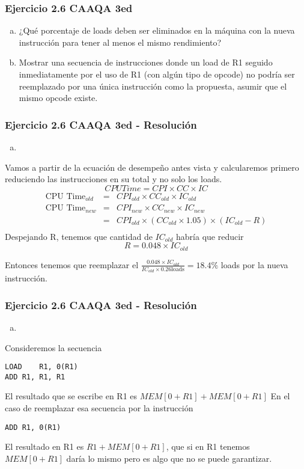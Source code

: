 \documentclass{beamer}
\begin{document}
\begin{frame}
 \frametitle{Ejercicio 2.6 CAAQA 3ed}
\begin{enumerate}[a.]
\item ¿Qué porcentaje de loads deben ser eliminados en la máquina con la nueva instrucción para tener al menos el mismo rendimiento?
\item Mostrar una secuencia de instrucciones donde un load de R1 seguido inmediatamente por el uso de R1 (con algún tipo de opcode) no podría ser reemplazado por una única instrucción como la propuesta, asumir que el mismo opcode existe.  
\end{enumerate}
\end{frame}

\begin{frame}
 \frametitle{Ejercicio 2.6 CAAQA 3ed - Resolución}
\begin{enumerate}[a.]
\item
\end{enumerate}
Vamos a partir de la ecuación de desempeño antes vista y calcularemos primero reduciendo las instrucciones en su total y no solo los loads. 
\[ CPU Time = CPI \times CC \times IC \]
\begin{eqnarray*}
\text{CPU Time}_{old} &=& CPI_{old} \times CC_{old} \times IC_{old} \\
\text{CPU Time}_{new} &=& CPI_{new} \times CC_{new} \times IC_{new} \\
&=& CPI_{old} \times (CC_{old} \times 1.05) \times (IC_{old} - R) \\
\end{eqnarray*}
Despejando R, tenemos que cantidad de $IC_{old}$ habría que reducir
\[R = 0.048 \times IC_{old} \]

Entonces tenemos que reemplazar el $\frac{0.048 \times IC_{old}}{IC_{old} \times 0.26 \text{loads} }= 18.4\% $ loads por la nueva instrucción.

\end{frame}

\begin{frame}[fragile]
 \frametitle{Ejercicio 2.6 CAAQA 3ed - Resolución}
\begin{enumerate}[b.]
\item
\end{enumerate}
Consideremos la secuencia
\begin{lstlisting}
LOAD 	R1, 0(R1)
ADD	R1, R1, R1
\end{lstlisting}
El resultado que se escribe en R1 es $MEM[0 + R1] + MEM[0 + R1]$
En el caso de reemplazar esa secuencia por la instrucción
\begin{lstlisting}
ADD	R1, 0(R1)
\end{lstlisting}

El resultado en R1 es $R1 + MEM[0 + R1]$, que si en R1 tenemos  $MEM[0 + R1]$ daría lo mismo pero es algo que no se puede garantizar.
\end{frame}
\end{document}
